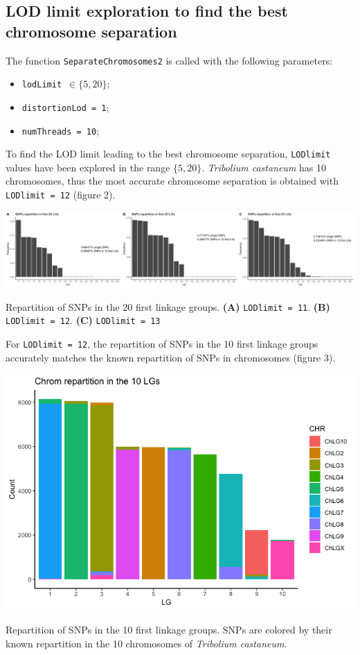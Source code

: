 \documentclass[english, a4paper, 12pt]{article}
\makeatletter
\newenvironment{figurehere}
{\def\@captype{figure}}
{}
\makeatother
\begin{document}
\subsection{LOD limit exploration to find the best chromosome separation}

The function \texttt{SeparateChromosomes2} is called with the following parameters:
\begin{itemize}
\item \texttt{lodLimit $\in \{5, 20\}$};
\item \texttt{distortionLod = 1};
\item \texttt{numThreads = 10};
\end{itemize}

To find the LOD limit leading to the best chromosome separation, \texttt{LODlimit} values have been explored in the range $\{5, 20\}$.
\textit{Tribolium castaneum} has 10 chromosomes, thus the most accurate chromosome separation is obtained with \texttt{LODlimit = 12} (figure 2).

\hfill

\begin{figurehere}
\centering
\includegraphics[width=1\linewidth]{figure2.png}
\caption{\small{Repartition of SNPs in the 20 first linkage groups. \textbf{(A)} \texttt{LODlimit = 11}. \textbf{(B)} \texttt{LODlimit = 12}. \textbf{(C)} \texttt{LODlimit = 13}}}
\end{figurehere}

\hfill

For \texttt{LODlimit = 12}, the repartition of SNPs in the 10 first linkage groups accurately matches the known repartition of SNPs in chromosomes (figure 3).

\hfill

\begin{figurehere}
\centering
\includegraphics[width=0.5\linewidth]{figure3.png}
\caption{\small{Repartition of SNPs in the 10 first linkage groups. SNPs are colored by their known repartition in the 10 chromosomes of \textit{Tribolium castaneum}.}}
\end{figurehere}
\end{document}
